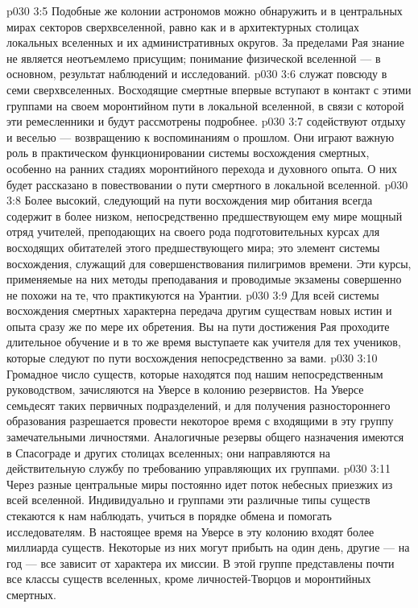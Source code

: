 \vs p030 3:5 Подобные же колонии астрономов можно обнаружить и в центральных мирах секторов сверхвселенной, равно как и в архитектурных столицах локальных вселенных и их административных округов. За пределами Рая знание не является неотъемлемо присущим; понимание физической вселенной --- в основном, результат наблюдений и исследований.
\vs p030 3:6 \pc {}\bibnobreakspace {} служат повсюду в семи сверхвселенных. Восходящие смертные впервые вступают в контакт с этими группами на своем моронтийном пути в локальной вселенной, в связи с которой эти ремесленники и будут рассмотрены подробнее.
\vs p030 3:7 \pc {}\bibnobreakspace {} содействуют отдыху и веселью --- возвращению к воспоминаниям о прошлом. Они играют важную роль в практическом функционировании системы восхождения смертных, особенно на ранних стадиях моронтийного перехода и духовного опыта. О них будет рассказано в повествовании о пути смертного в локальной вселенной.
\vs p030 3:8 \pc {}\bibnobreakspace {} Более высокий, следующий на пути восхождения мир обитания всегда содержит в более низком, непосредственно предшествующем ему мире мощный отряд учителей, преподающих на своего рода подготовительных курсах для восходящих обитателей этого предшествующего мира; это элемент системы восхождения, служащий для совершенствования пилигримов времени. Эти курсы, применяемые на них методы преподавания и проводимые экзамены совершенно не похожи на те, что практикуются на Урантии.
\vs p030 3:9 Для всей системы восхождения смертных характерна передача другим существам новых истин и опыта сразу же по мере их обретения. Вы на пути достижения Рая проходите длительное обучение и в то же время выступаете как учителя для тех учеников, которые следуют по пути восхождения непосредственно за вами.
\vs p030 3:10 \pc {}\bibnobreakspace {} Громадное число существ, которые находятся под нашим непосредственным руководством, зачисляются на Уверсе в колонию резервистов. На Уверсе семьдесят таких первичных подразделений, и для получения разностороннего образования разрешается провести некоторое время с входящими в эту группу замечательными личностями. Аналогичные резервы общего назначения имеются в Спасограде и других столицах вселенных; они направляются на действительную службу по требованию управляющих их группами.
\vs p030 3:11 \pc {}\bibnobreakspace {} Через разные центральные миры постоянно идет поток небесных приезжих из всей вселенной. Индивидуально и группами эти различные типы существ стекаются к нам наблюдать, учиться в порядке обмена и помогать исследователям. В настоящее время на Уверсе в эту колонию входят более миллиарда существ. Некоторые из них могут прибыть на один день, другие --- на год --- все зависит от характера их миссии. В этой группе представлены почти все классы существ вселенных, кроме личностей\hyp{}Творцов и моронтийных смертных.
